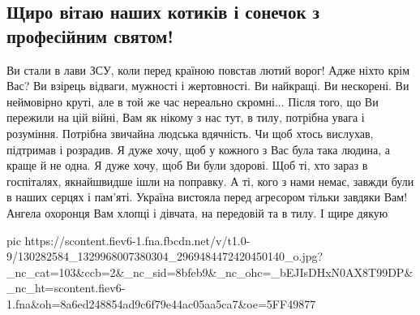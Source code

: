  
 
 
 
 
\subsection{Щиро вітаю наших котиків і сонечок з професійним святом!}

\obeycr
Ви стали в лави ЗСУ, коли перед країною повстав лютий ворог!
Адже ніхто крім Вас?
Ви взірець відваги, мужності і жертовності.
Ви найкращі.
Ви нескорені.
Ви неймовірно круті, але в той же час нереально скромні...
Після того, що Ви пережили на цій війні, Вам як нікому з нас тут, в тилу, потрібна увага і розуміння. 
Потрібна звичайна людська вдячність.
Чи щоб хтось вислухав, підтримав і розрадив.
Я дуже хочу, щоб у кожного з Вас була така людина, а краще й не одна.
Я дуже хочу, щоб Ви були здорові.
Щоб ті, хто зараз в госпіталях, якнайшвидше ішли на поправку.
А ті, кого з нами немає, завжди були в наших серцях і пам'яті.
Україна вистояла перед агресором тільки завдяки Вам!
Ангела охоронця Вам хлопці і дівчата, на передовій та в тилу.
І щире дякую 
\restorecr

\ifcmt
pic https://scontent.fiev6-1.fna.fbcdn.net/v/t1.0-9/130282584_1329968007380304_2969484472420450140_o.jpg?_nc_cat=103&ccb=2&_nc_sid=8bfeb9&_nc_ohc=_bEJIsDHxN0AX8T99DP&_nc_ht=scontent.fiev6-1.fna&oh=8a6ed248854ad9c6f79e44ac05aa5ca7&oe=5FF49877
\fi
